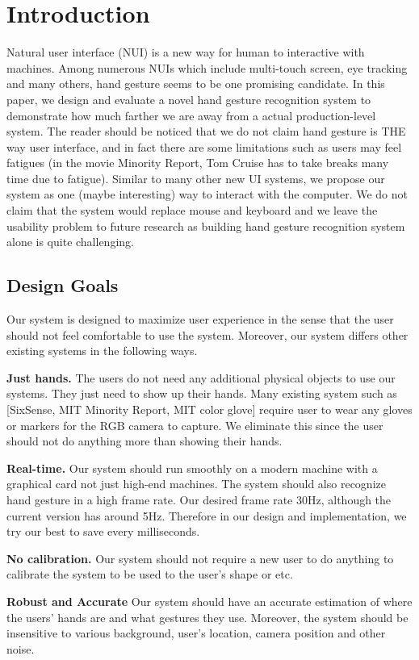 \section{Introduction}
Natural user interface (NUI) is a new way for human to interactive with machines. Among numerous NUIs which include multi-touch screen, eye tracking and many others, hand gesture seems to be one promising candidate. In this paper, we design and evaluate a novel hand gesture recognition system to demonstrate how much farther we are away from a actual production-level system. The reader should be noticed that we do not claim hand gesture is THE way user interface, and in fact there are some limitations such as users may feel fatigues (in the movie Minority Report, Tom Cruise has to take breaks many time due to fatigue). Similar to many other new UI systems, we propose our system as one (maybe interesting) way to interact with the computer. We do not claim that the system would replace mouse and keyboard and we leave the usability problem to future research as building hand gesture recognition system alone is quite challenging. 


\subsection{Design Goals}
Our system is designed to maximize user experience in the sense that the user should not feel comfortable to use the system. Moreover, our system differs other existing systems in the following ways.

\textbf{Just hands.} The users do not need any additional physical objects to use our systems. They just need to show up their hands. Many existing system such as [SixSense, MIT Minority Report, MIT color glove] require user to wear any gloves or markers  for the RGB camera to capture. We eliminate this since the user should not do anything more than showing their hands. 
  
\textbf{Real-time.} Our system should run smoothly on a modern machine with a graphical card not just high-end machines. The system should also recognize hand gesture in a high frame rate. Our desired frame rate 30Hz, although the current version has around 5Hz. Therefore in our design and implementation, we try our best to save every milliseconds. 

\textbf{No calibration.} Our system should not require a new user to do anything to calibrate the system to be used to the user's shape or etc. 

\textbf{Robust and Accurate} Our system should have an accurate estimation of where the users' hands are and what gestures they use. Moreover, the system should be insensitive to various background, user's location, camera position and other noise. 
  
